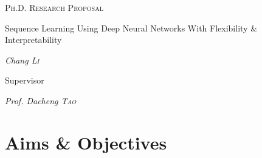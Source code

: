 \message{ !name(usyd_phd_proposal.tex)}\documentclass{article} \usepackage{tabularx}
\begin{document}



\begin{titlepage}
	\centering
	\begin{figure}[H]
    \centering
	\end{figure}
	\vspace{2cm} {\scshape\LARGE Ph.D. Research Proposal\par}
  \vspace{2cm}
  
	{\scshape\LARGE

    Sequence Learning Using Deep Neural Networks With Flexibility
    \& Interpretability
    
    \par} {\huge\bfseries \par}
	
	\vspace{2cm} {\Large\itshape Chang \textsc{Li}\par} \vfill

  {\Large Supervisor\par} {\Large\itshape Prof. Dacheng
    \textsc{Tao}\par} \vfill

\end{titlepage}


\section{Aims \& Objectives}
\end{document}
